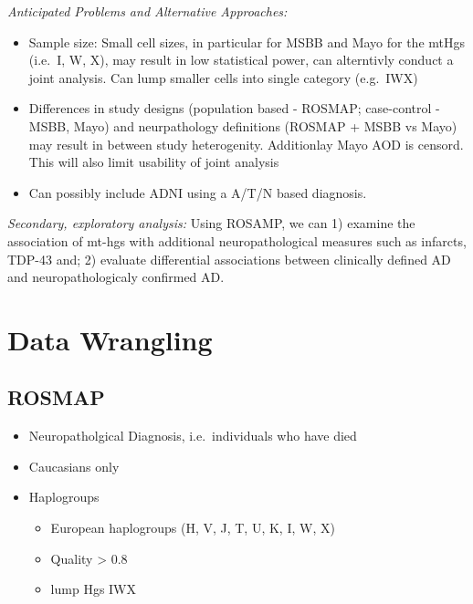 \documentclass[]{book}
\providecommand{\tightlist}{%
  \setlength{\itemsep}{0pt}\setlength{\parskip}{0pt}}
\begin{document}
\emph{Anticipated Problems and Alternative Approaches:}

\begin{itemize}
\tightlist
\item
  Sample size: Small cell sizes, in particular for MSBB and Mayo for the mtHgs (i.e.~I, W, X), may result in low statistical power, can alterntivly conduct a joint analysis. Can lump smaller cells into single category (e.g.~IWX)
\item
  Differences in study designs (population based - ROSMAP; case-control - MSBB, Mayo) and neurpathology definitions (ROSMAP + MSBB vs Mayo) may result in between study heterogenity. Additionlay Mayo AOD is censord. This will also limit usability of joint analysis
\item
  Can possibly include ADNI using a A/T/N based diagnosis.
\end{itemize}

\emph{Secondary, exploratory analysis:} Using ROSAMP, we can 1) examine the association of mt-hgs with additional neuropathological measures such as infarcts, TDP-43 and; 2) evaluate differential associations between clinically defined AD and neuropathologicaly confirmed AD.

\hypertarget{data-wrangling}{%
\section{Data Wrangling}\label{data-wrangling}}

\hypertarget{rosmap}{%
\subsection{ROSMAP}\label{rosmap}}

\begin{itemize}
\tightlist
\item
  Neuropatholgical Diagnosis, i.e.~individuals who have died
\item
  Caucasians only
\item
  Haplogroups

  \begin{itemize}
  \tightlist
  \item
    European haplogroups (H, V, J, T, U, K, I, W, X)
  \item
    Quality \textgreater{} 0.8
  \item
    lump Hgs IWX
  \end{itemize}
\end{itemize}
\end{document}
